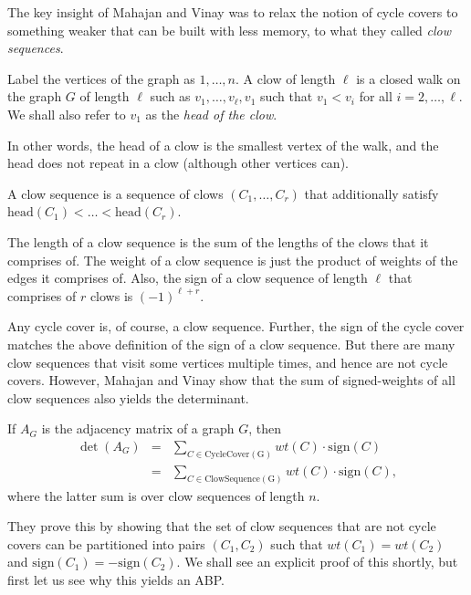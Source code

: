 The key insight of Mahajan and Vinay was to relax the notion of cycle covers to something weaker that can be built with less memory, to what they called \emph{clow sequences}. 

\begin{definition}
Label the vertices of the graph as $1,\dots, n$. 
A clow  of length $\ell$ is a closed walk on the graph $G$ of length $\ell$ such as $v_1,\dots, v_\ell,v_1$ such that $v_1 < v_i$ for all $i=2,\dots, \ell$. 
We shall also refer to $v_1$ as the \emph{head of the clow}. 

In other words, the head of a clow is the smallest vertex of the walk, and the head does not repeat in a clow (although other vertices can). 

A clow sequence is a sequence of clows $(C_1,\dots, C_r)$ that additionally satisfy $\mathrm{head}(C_1) < \dots < \mathrm{head}(C_r)$. 

The length of a clow sequence is the sum of the lengths of the clows that it comprises of. 
The weight of a clow sequence is just the product of weights of the edges it comprises of. 
Also, the sign of a clow sequence of length $\ell$ that comprises of $r$ clows is $(-1)^{\ell + r}$. 
\end{definition}

Any cycle cover is, of course, a clow sequence. 
Further, the sign of the cycle cover matches the above definition of the sign of a clow sequence. 
But there are many clow sequences that visit some vertices multiple times, and hence are not cycle covers. 
However, Mahajan and Vinay show that the sum of signed-weights of all clow sequences also yields the determinant. 

\begin{lemma}[\cite{mv97}]\label{lem:mv-clowseq} If $A_G$ is the adjacency matrix of a graph $G$, then
\begin{eqnarray*}
\det(A_G) & = &  \sum_{C \in \mathrm{CycleCover(G)}} wt(C) \cdot \mathrm{sign}(C)\\
& = & \sum_{C \in \mathrm{ClowSequence(G)}} wt(C) \cdot \mathrm{sign}(C),
\end{eqnarray*}
where the latter sum is over clow sequences of length $n$.
\end{lemma}

They prove this by showing that the set of clow sequences that are not cycle covers can be partitioned into pairs $(C_1,C_2)$ such that $wt(C_1) = wt(C_2)$ and $\mathrm{sign}(C_1) = - \mathrm{sign}(C_2)$. 
We shall see an explicit proof of this shortly, but first let us see why this yields an ABP. \\

